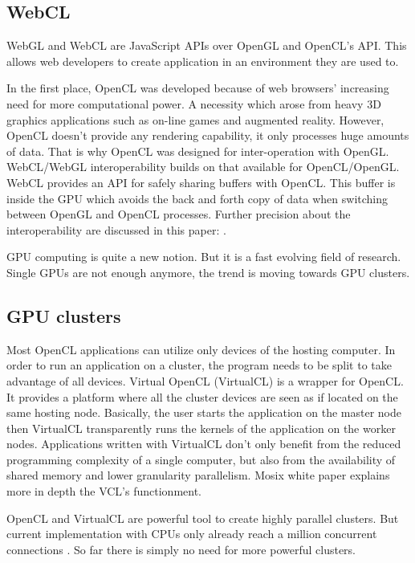 \subsection{WebCL}

WebGL and WebCL are JavaScript APIs over OpenGL and OpenCL's API. This allows
web developers to create application in an environment they are used to.

In the first place, OpenCL was developed because of web browsers' increasing
need for more computational power. A necessity which arose from heavy 3D
graphics applications such as on-line games and augmented reality. However,
OpenCL doesn’t provide any rendering capability, it only processes huge amounts
of data. That is why OpenCL was designed for inter-operation with OpenGL.
WebCL/WebGL interoperability builds on that available for OpenCL/OpenGL. WebCL
provides an API for safely sharing buffers with OpenCL. This buffer is inside
the GPU which avoids the back and forth copy of data when switching between
OpenGL and OpenCL processes. Further precision about the interoperability are
discussed in this paper: \citep{Reference6}.

GPU computing is quite a new notion. But it is a fast evolving field of
research. Single GPUs are not enough anymore, the trend is moving towards GPU
clusters.

\subsection{GPU clusters}

Most OpenCL applications can utilize only devices of the hosting computer. In
order to run an application on a cluster, the program needs to be split to take
advantage of all devices. Virtual OpenCL (VirtualCL) is a wrapper for OpenCL.
It provides a platform where all the cluster devices are seen as if located on
the same hosting node. Basically, the user starts the application on the master
node then VirtualCL transparently runs the kernels of the application on the
worker nodes. Applications written with VirtualCL don't only benefit from the
reduced programming complexity of a single computer, but also from the
availability of shared memory and lower granularity parallelism. Mosix white
paper \citep{Reference7} explains more in depth the VCL's functionment.


OpenCL and VirtualCL are powerful tool to create highly parallel clusters.  But
current implementation with CPUs only already reach a million concurrent
connections \citep{Reference13}. So far there is simply no need for more
powerful clusters.

